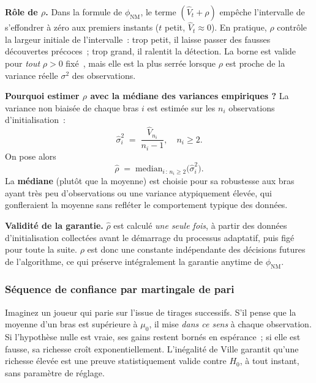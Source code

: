 \documentclass[10.5pt,a4paper]{article}
\newcommand{\phinm}{\phi_{\mathrm{NM}}}
\begin{document}
\begin{pratique}
\textbf{Rôle de $\rho$.}
Dans la formule de $\phinm$, le terme $(\hat{V}_t + \rho)$ empêche
l'intervalle de s'effondrer à zéro aux premiers instants ($t$ petit,
$\hat{V}_t \approx 0$). En pratique, $\rho$ contrôle la largeur initiale
de l'intervalle~: trop petit, il laisse passer des fausses découvertes
précoces~; trop grand, il ralentit la détection. La borne est valide pour
\emph{tout} $\rho > 0$ fixé~\cite{howard2021}, mais elle est la plus
serrée lorsque $\rho$ est proche de la variance réelle $\sigma^2$ des
observations.

\textbf{Pourquoi estimer $\rho$ avec la médiane des variances empiriques ?}
La variance non biaisée de chaque bras $i$ est estimée sur les
$n_i$ observations d'initialisation~:
\[
  \hat{\sigma}_i^2 \;=\; \frac{\hat{V}_{n_i}}{n_i - 1},
  \quad n_i \geq 2.
\]
On pose alors
\[
  \hat{\rho} \;=\; \mathrm{median}_{i\,:\,n_i \geq 2}\!\bigl(\hat{\sigma}_i^2\bigr).
\]
La \textbf{médiane} (plutôt que la moyenne) est choisie pour sa robustesse
aux bras ayant très peu d'observations ou une variance atypiquement
élevée, qui gonfleraient la moyenne sans refléter le comportement typique
des données.

\textbf{Validité de la garantie.}
$\hat{\rho}$ est calculé \emph{une seule fois}, à partir des données
d'initialisation collectées avant le démarrage du processus adaptatif,
puis figé pour toute la suite. $\rho$ est donc une constante
indépendante des décisions futures de l'algorithme, ce qui préserve
intégralement la garantie anytime de $\phinm$.
\end{pratique}

\subsubsection{S\'equence de confiance par martingale de pari}

\begin{intuition}
Imaginez un joueur qui parie sur l'issue de tirages successifs. S'il
pense que la moyenne d'un bras est sup\'erieure \`a $\mu_0$, il mise
\emph{dans ce sens} \`a chaque observation. Si l'hypoth\`ese nulle est
vraie, ses gains restent born\'es en esp\'erance~; si elle est fausse,
sa richesse cro\^it exponentiellement. L'in\'egalit\'e de Ville garantit
qu'une richesse \'elev\'ee est une preuve statistiquement valide contre
$H_0$, \`a tout instant, sans param\`etre de r\'eglage.
\end{intuition}
\end{document}

